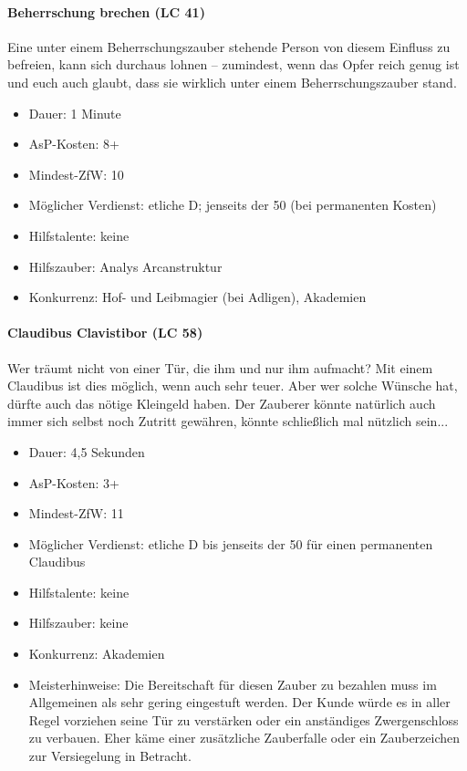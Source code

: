 \paragraph{Beherrschung brechen (LC 41)}
Eine unter einem Beherrschungszauber stehende Person von diesem Einfluss zu befreien, kann sich durchaus lohnen -- zumindest, wenn das Opfer reich genug ist und euch auch glaubt, dass sie wirklich unter einem Beherrschungszauber stand.
\begin{itemize}
	\item Dauer: 1 Minute
	\item AsP-Kosten: 8+
	\item Mindest-ZfW: 10
	\item Möglicher Verdienst: etliche D; jenseits der \SI{50}{\D} (bei permanenten Kosten)
	\item Hilfstalente: keine
	\item Hilfszauber: Analys Arcanstruktur
	\item Konkurrenz: Hof- und Leibmagier (bei Adligen), Akademien
\end{itemize}

\paragraph{Claudibus Clavistibor (LC 58)}
Wer träumt nicht von einer Tür, die ihm und nur ihm aufmacht? Mit einem Claudibus ist dies möglich, wenn auch sehr teuer. Aber wer solche Wünsche hat, dürfte auch das nötige Kleingeld haben. Der Zauberer könnte natürlich auch immer sich selbst noch Zutritt gewähren, könnte schließlich mal nützlich sein...
\begin{itemize}
	\item Dauer: 4,5 Sekunden
	\item AsP-Kosten: 3+
	\item Mindest-ZfW: 11
	\item Möglicher Verdienst: etliche D bis jenseits der \SI{50}{\D} für einen permanenten Claudibus
	\item Hilfstalente: keine
	\item Hilfszauber: keine
	\item Konkurrenz: Akademien
	\item Meisterhinweise: Die Bereitschaft für diesen Zauber zu bezahlen muss im Allgemeinen als sehr gering eingestuft werden. Der Kunde würde es in aller Regel vorziehen seine Tür zu verstärken oder ein anständiges Zwergenschloss zu verbauen. Eher käme einer zusätzliche Zauberfalle oder ein Zauberzeichen zur Versiegelung in Betracht.
\end{itemize}

